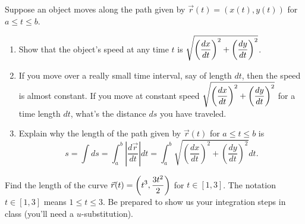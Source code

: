 \begin{problem} 
Suppose an object moves along the path given by $\vec r(t)=(x(t),y(t))$ for $a\leq t\leq b$. 
\begin{enumerate}
\item Show that the object's speed at any time $t$ is 
$\displaystyle\sqrt{\left(\frac{dx}{dt}\right)^2+\left(\frac{dy}{dt}\right)^2}$.
\item If you move over a really small time interval, say of length $dt$, then the speed is almost constant. If you move at constant speed $\displaystyle\sqrt{\left(\frac{dx}{dt}\right)^2+\left(\frac{dy}{dt}\right)^2}$ for a time length $dt$, what's the distance $ds$ you have traveled. 
\item  Explain why the length of the path given by $\vec r(t)$ for $a\leq t\leq b$ is  
$$s=\int ds=\int_a^b \left|\frac{d\vec r}{dt}\right| dt=\int_a^b \sqrt{\left(\frac{dx}{dt}\right)^2+\left(\frac{dy}{dt}\right)^2}dt.$$
\end{enumerate}
\end{problem}

\begin{problem} 
Find the length of the curve  $\displaystyle \vec r(t) = \left(t^3,\frac{3t^2}{2}\right)$ for $t\in[1,3]$. The notation $t\in[1,3]$ means $1\leq t\leq 3$. Be prepared to show us your integration steps in class (you'll need a $u$-substitution).
\end{problem}

